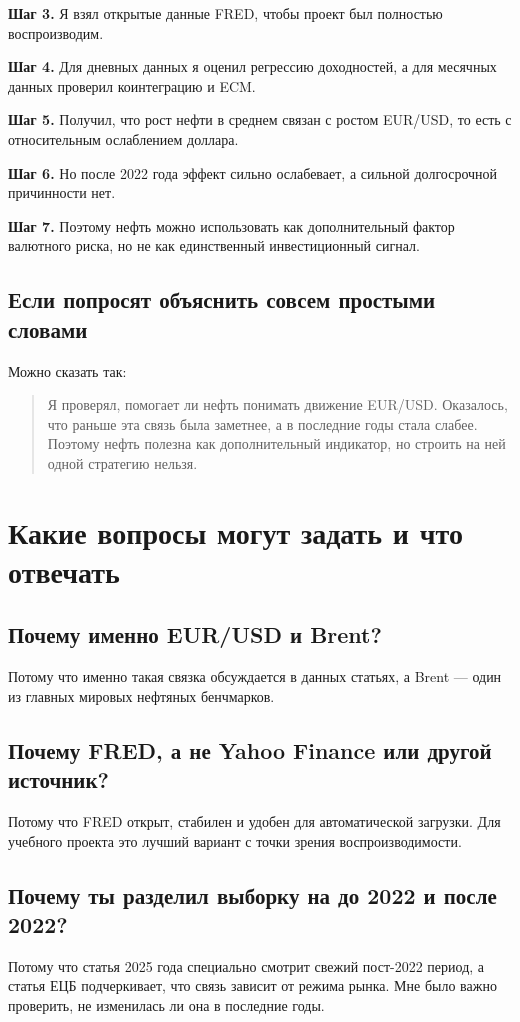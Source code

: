 \documentclass[a4paper,12pt]{article}
\begin{document}
\textbf{Шаг 3.} Я взял открытые данные FRED, чтобы проект был полностью воспроизводим.

\textbf{Шаг 4.} Для дневных данных я оценил регрессию доходностей, а для месячных данных проверил коинтеграцию и ECM.

\textbf{Шаг 5.} Получил, что рост нефти в среднем связан с ростом EUR/USD, то есть с относительным ослаблением доллара.

\textbf{Шаг 6.} Но после 2022 года эффект сильно ослабевает, а сильной долгосрочной причинности нет.

\textbf{Шаг 7.} Поэтому нефть можно использовать как дополнительный фактор валютного риска, но не как единственный инвестиционный сигнал.

\subsection{Если попросят объяснить совсем простыми словами}
Можно сказать так:

\begin{quote}
Я проверял, помогает ли нефть понимать движение EUR/USD. Оказалось, что раньше эта связь была заметнее, а в последние годы стала слабее. Поэтому нефть полезна как дополнительный индикатор, но строить на ней одной стратегию нельзя.
\end{quote}

\section{Какие вопросы могут задать и что отвечать}

\subsection{Почему именно EUR/USD и Brent?}
Потому что именно такая связка обсуждается в данных статьях, а Brent --- один из главных мировых нефтяных бенчмарков.

\subsection{Почему FRED, а не Yahoo Finance или другой источник?}
Потому что FRED открыт, стабилен и удобен для автоматической загрузки. Для учебного проекта это лучший вариант с точки зрения воспроизводимости.

\subsection{Почему ты разделил выборку на до 2022 и после 2022?}
Потому что статья 2025 года специально смотрит свежий пост-2022 период, а статья ЕЦБ подчеркивает, что связь зависит от режима рынка. Мне было важно проверить, не изменилась ли она в последние годы.
\end{document}

